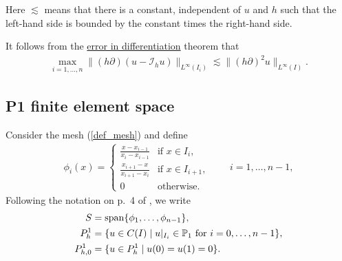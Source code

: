 \documentclass[12pt,oneside]{amsart}
\def\I{\mathcal I}
\DeclareMathOperator{\linspan}{span}
\begin{document}
Here $\lesssim$ means that there is a constant, independent of $u$ and $h$ such that the left-hand side is bounded by the constant times the right-hand side.

It follows from the \href{https://nbviewer.org/github/uh-comp-methods1/notebooks/blob/main/interpolation/lecture.ipynb#Theorem:-error-in-differentiation}{error in differentiation} theorem that 
    \begin{align}\label{eq_err_in_diff}
\max_{i=1,\dots,n}\|(h\partial)(u - \I_h u)\|_{L^\infty(I_i)} \lesssim \|(h \partial)^2 u\|_{L^\infty(I)}.
    \end{align}

\subsection{P1 finite element space}

Consider the mesh (\ref{def_mesh}) and define 
    \begin{align}\label{def_P1_basis}
\phi_i(x) = \begin{cases}
\frac{x - x_{i-1}}{x_i - x_{i-1}} & \text{if $x \in I_i$},
\\
\frac{x_{i+1} - x}{x_{i+1} - x_i} & \text{if $x \in I_{i+1}$},
\\
0 & \text{otherwise}.
\end{cases}
\qquad i = 1,\dots,n-1,
    \end{align}
Following the notation on p.~4 of \cite{EG}, we write
    \begin{align}\label{def_S}
S &= \linspan \{ \phi_1,\dots,\phi_{n-1} \},
\\\notag
P^1_{h} &= \{ u \in C(I) \mid \text{$u|_{I_{i}} \in \mathbb P_1$ for $i=0,\dots,n-1$} \},
\\\notag
P^1_{h,0} &= \{ u \in P^1_{h} \mid u(0) = u(1) = 0 \}.
    \end{align}
\end{document}
